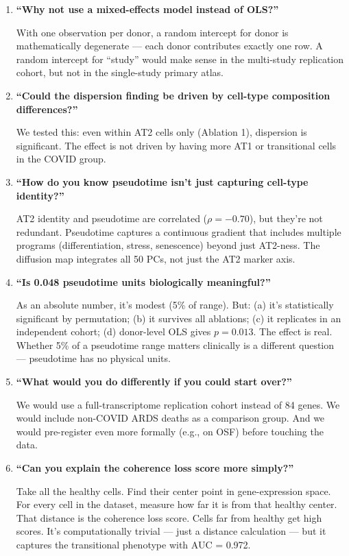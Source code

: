 \documentclass[11pt]{article}
\begin{document}
\begin{enumerate}[leftmargin=*]

\item \textbf{``Why not use a mixed-effects model instead of OLS?''}

With one observation per donor, a random intercept for donor is mathematically degenerate --- each donor contributes exactly one row. A random intercept for ``study'' would make sense in the multi-study replication cohort, but not in the single-study primary atlas.

\item \textbf{``Could the dispersion finding be driven by cell-type composition differences?''}

We tested this: even within AT2 cells only (Ablation 1), dispersion is significant. The effect is not driven by having more AT1 or transitional cells in the COVID group.

\item \textbf{``How do you know pseudotime isn't just capturing cell-type identity?''}

AT2 identity and pseudotime are correlated ($\rho = -0.70$), but they're not redundant. Pseudotime captures a continuous gradient that includes multiple programs (differentiation, stress, senescence) beyond just AT2-ness. The diffusion map integrates all 50 PCs, not just the AT2 marker axis.

\item \textbf{``Is 0.048 pseudotime units biologically meaningful?''}

As an absolute number, it's modest (5\% of range). But: (a) it's statistically significant by permutation; (b) it survives all ablations; (c) it replicates in an independent cohort; (d) donor-level OLS gives $p = 0.013$. The effect is real. Whether 5\% of a pseudotime range matters clinically is a different question --- pseudotime has no physical units.

\item \textbf{``What would you do differently if you could start over?''}

We would use a full-transcriptome replication cohort instead of 84 genes. We would include non-COVID ARDS deaths as a comparison group. And we would pre-register even more formally (e.g., on OSF) before touching the data.

\item \textbf{``Can you explain the coherence loss score more simply?''}

Take all the healthy cells. Find their center point in gene-expression space. For every cell in the dataset, measure how far it is from that healthy center. That distance is the coherence loss score. Cells far from healthy get high scores. It's computationally trivial --- just a distance calculation --- but it captures the transitional phenotype with AUC = 0.972.


\end{enumerate}
\end{document}
